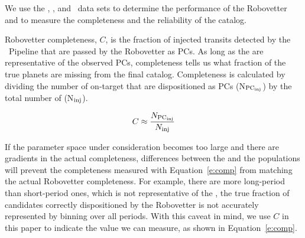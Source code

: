 %

\newcommand{\opsfp}{N$_{\rm FP_{\rm obs}}$}
\newcommand{\opspc}{N$_{\rm PC_{\rm obs}}$}
\newcommand{\opsN}{N$_{\rm obs}$}
\newcommand{\trueopspc}{T$_{\rm PC_{\rm obs}}$}
\newcommand{\missedfp}{T$_{\rm FP_{\rm obs}}$ - N$_{\rm FP_{\rm obs}}$}
\newcommand{\invfp}{N$_{\rm FP_{\rm inv}}$}
\newcommand{\invpc}{N$_{\rm PC_{\rm inv}}$}
\newcommand{\invN}{N$_{\rm inv}$}
\newcommand{\sfatce}{sfaTCE}


We use the \injtce, \scrtce, and \invtce\ data sets to determine the performance of the Robovetter and to measure the completeness and the reliability of the catalog. 

{\color{blue}
Robovetter completeness, $C$, is the fraction of injected transits detected by the \Kepler\ Pipeline that are passed by the Robovetter as PCs.  As long as the  are representative of the observed PCs, completeness tells us what fraction of the true planets are missing from the final catalog.  Completeness is calculated by dividing the number of on-target  that are dispositioned as PCs (N$_{\rm PC_{\rm inj}}$) by the total number of  (N$_{\rm inj}$).

\begin{equation}
C \approx \frac{N_{\rm PC_{\rm inj}}}{N_{\rm inj}}
\label{e:comp}
\end{equation}

\noindent If the parameter space under consideration becomes too large and there are gradients in the actual completeness, differences between the \injtce and the \opstce{} populations will prevent the completeness measured with Equation~\ref{e:comp} from matching the actual Robovetter completeness. For example, there are more long-period  than short-period ones, which is not representative of the , the true fraction of candidates correctly dispositioned by the Robovetter is not accurately represented by binning over all periods. With this caveat in mind, we use $C$ in this paper to indicate the value we can measure, as shown in Equation~\ref{e:comp}.

}

